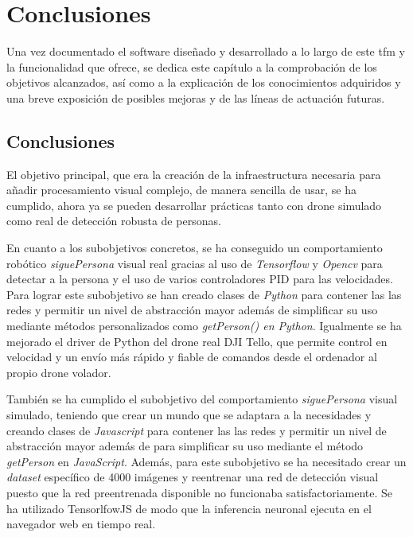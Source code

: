 \chapter{Conclusiones}\label{cap.conclusiones}
Una vez documentado el software diseñado y desarrollado a lo largo de este \acrshort{tfm} y la funcionalidad que ofrece, se dedica este capítulo a la comprobación de los objetivos alcanzados, así como a la explicación de los conocimientos adquiridos y una breve exposición de posibles mejoras y de las líneas de actuación futuras.
\section{Conclusiones}
El objetivo principal, que era la creación de la infraestructura necesaria para añadir procesamiento visual complejo, de manera sencilla de usar, se ha cumplido, ahora ya se pueden desarrollar prácticas tanto con drone simulado como real de detección robusta de personas.
\newline

En cuanto a los subobjetivos concretos, se ha conseguido un comportamiento robótico \textit{siguePersona} visual real gracias al uso de \textit{Tensorflow} y \textit{Opencv} para detectar a la persona y el uso de varios controladores PID para las velocidades. Para lograr este subobjetivo se han creado clases de \textit{Python} para contener las las redes y permitir un nivel de abstracción mayor además de simplificar su uso mediante métodos personalizados como \textit{getPerson() en \textit{Python}}. Igualmente se ha mejorado el driver de Python del drone real DJI Tello, que permite control en velocidad y un envío más rápido y fiable de comandos desde el ordenador al propio drone volador.
\newline

También se ha cumplido el subobjetivo del comportamiento \textit{siguePersona} visual simulado, teniendo que crear un mundo que se adaptara a la necesidades y creando clases de \textit{Javascript} para contener las las redes y permitir un nivel de abstracción mayor además de para simplificar su uso mediante el método \textit{getPerson} en \textit{JavaScript}. Además, para este subobjetivo se ha necesitado crear un \textit{dataset} específico de 4000 imágenes y reentrenar una red de detección visual puesto que la red preentrenada disponible no funcionaba satisfactoriamente. Se ha utilizado TensorlfowJS de modo que la inferencia neuronal ejecuta en el navegador web en tiempo real.
\newline

